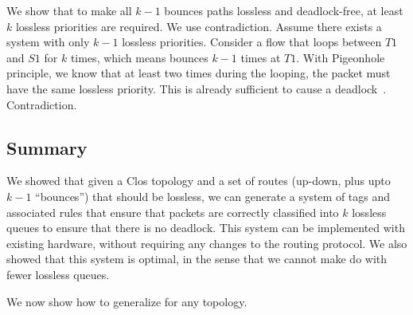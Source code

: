  We show that
to make all $k-1$ bounces paths lossless and deadlock-free, at least $k$
lossless priorities are required. We use contradiction.  Assume there exists a
system with only $k-1$ lossless priorities. Consider a flow that loops between
$T1$ and $S1$ for $k$ times, which means bounces $k-1$ times at $T1$. With
Pigeonhole principle, we know that at least two times during the looping, the
packet must have the same lossless priority. This is already sufficient to cause
a deadlock~\cite{our_hotnets_paper}. Contradiction.

\subsection {Summary}

We showed that given a Clos topology and a set of routes (up-down, plus
upto $k-1$ ``bounces'') that should be lossless, we can generate a system of
tags and associated rules that ensure that packets are correctly classified
into $k$ lossless queues to ensure that there is no deadlock.   This system can
be implemented with existing hardware, without requiring any changes to the
routing protocol. We also showed that this system is optimal, in the sense that
we cannot make do with fewer lossless queues.

We now show how to generalize \sysname{} for any topology.

